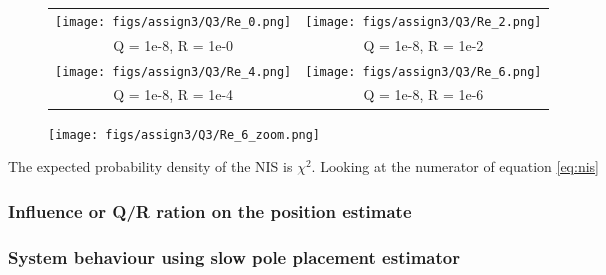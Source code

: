 \documentclass[a4paper]{article}
\newcommand{\newpar}{\vspace{.3cm}\noindent}
\begin{document}
\begin{figure}[H]
\begin{adjustwidth}{-3cm}{-3cm}
\centering
\begin{tabular}{cc}
  \texttt{[image: figs/assign3/Q3/Re\_0.png]} &   \texttt{[image: figs/assign3/Q3/Re\_2.png]} \\
  Q = 1e-8, R = 1e-0 & Q = 1e-8, R = 1e-2 \\[8pt]
 \texttt{[image: figs/assign3/Q3/Re\_4.png]} &   \texttt{[image: figs/assign3/Q3/Re\_6.png]} \\
 Q = 1e-8, R = 1e-4 & Q = 1e-8, R = 1e-6 \\[8pt]
\end{tabular}
\end{adjustwidth}
\label{fig:cteQR}
\end{figure}

\begin{figure}[H]
    \centering
    \texttt{[image: figs/assign3/Q3/Re\_6\_zoom.png]}
    \label{fig:zoomconsistent}
\end{figure}

\newpar
The expected probability density of the NIS is $\chi^2$. Looking at the numerator of equation \autoref{eq:nis}

\subsubsection{Influence or Q/R ration on the position estimate}

\subsubsection{System behaviour using slow pole placement estimator}
\end{document}
